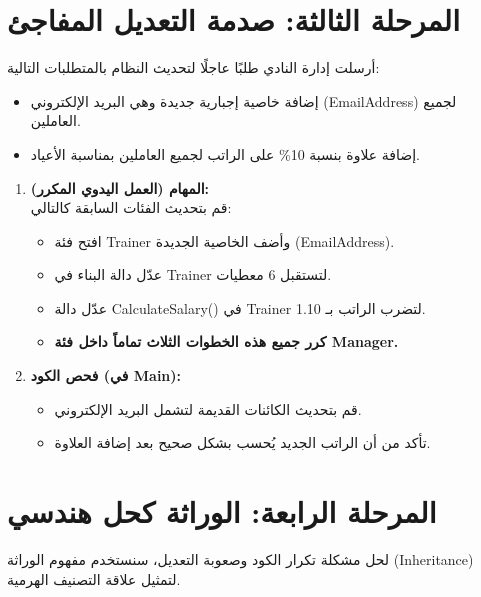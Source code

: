 \documentclass[14pt]{extarticle}
\begin{document}
\clearpage
\section*{المرحلة الثالثة: صدمة التعديل المفاجئ}
أرسلت إدارة النادي طلبًا عاجلًا لتحديث النظام بالمتطلبات التالية:
\begin{itemize}
    \item إضافة خاصية إجبارية جديدة وهي البريد الإلكتروني (\textenglish{EmailAddress}) لجميع العاملين.
    \item إضافة علاوة بنسبة 10\% على الراتب لجميع العاملين بمناسبة الأعياد.
\end{itemize}

\begin{enumerate}[itemsep=3em]
    \item
    \textbf{المهام (العمل اليدوي المكرر):} \\
    قم بتحديث الفئات السابقة كالتالي:
    \begin{itemize}
        \item افتح فئة \textenglish{Trainer} وأضف الخاصية الجديدة (\textenglish{EmailAddress}).
        \item عدّل دالة البناء في \textenglish{Trainer} لتستقبل 6 معطيات.
        \item عدّل دالة \textenglish{CalculateSalary()} في \textenglish{Trainer} لتضرب الراتب بـ 1.10.
        \item \textbf{كرر جميع هذه الخطوات الثلاث تماماً داخل فئة \textenglish{Manager}.}
    \end{itemize}

    \item
    \textbf{فحص الكود (في \textenglish{Main}):} \\
    \begin{itemize}
        \item قم بتحديث الكائنات القديمة لتشمل البريد الإلكتروني.
        \item تأكد من أن الراتب الجديد يُحسب بشكل صحيح بعد إضافة العلاوة.
    \end{itemize}
\end{enumerate}

\clearpage
\section*{المرحلة الرابعة: الوراثة كحل هندسي}
لحل مشكلة تكرار الكود وصعوبة التعديل، سنستخدم مفهوم الوراثة (Inheritance) لتمثيل علاقة التصنيف الهرمية.
\end{document}
